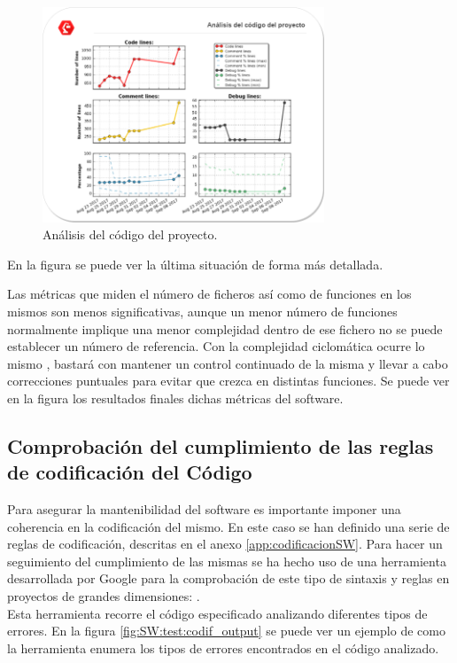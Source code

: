     \begin{figure}[H]
        \centering
        \includegraphics[width=0.75\textwidth]{figuras/Imagenes_SW/analisis_codigo.png}
        \caption{Análisis del código del proyecto. }
        \label{fig:SW:code_analysis}
    \end{figure}

    En la figura \completar se puede ver la última situación de forma más detallada.


    Las métricas que miden el número de ficheros así como de funciones en los mismos son menos significativas, aunque un menor número de funciones normalmente implique una menor complejidad dentro de ese fichero no se puede establecer un número de referencia. Con la complejidad ciclomática ocurre lo mismo , bastará con mantener un control continuado de la misma y llevar a cabo correcciones puntuales para evitar que crezca en distintas funciones. Se puede ver en la figura \completar los resultados finales dichas métricas del software.


    \subsection{Comprobación del cumplimiento de las reglas de codificación del Código}
        Para asegurar la mantenibilidad del software es importante imponer una coherencia en la codificación del mismo. En este caso se han definido una serie de reglas de codificación, descritas en el anexo \ref{app:codificacionSW}. Para hacer un seguimiento del cumplimiento de las mismas se ha hecho uso de una herramienta desarrollada por Google para la comprobación de este tipo de sintaxis y reglas en proyectos de grandes dimensiones: .
        \\
        Esta herramienta recorre el código especificado analizando diferentes tipos de errores. En la figura \ref{fig:SW:test:codif_output} se puede ver un ejemplo de como la herramienta enumera los tipos de errores encontrados en el código analizado.


